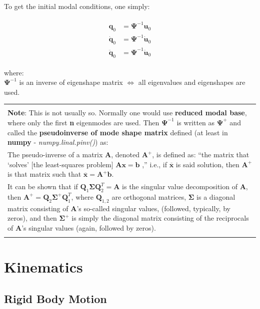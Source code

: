 \documentclass[10pt,b5paper,titlepage]{book}
\newcommand{\m}{\mathbf}
\newcommand{\M}{\pmb}
\newenvironment{bbox}[1][0.96]
{
    \begin{center}
        \begin{tabular}{|p{#1\textwidth}|}
            \hline\\
}
{
            \\\\\hline
        \end{tabular}
    \end{center}
}
\newenvironment{eqarray}
{
    \begin{eqnarray}
        \begin{aligned}
}
{
        \end{aligned}
    \end{eqnarray}
}
\begin{document}
To get the initial modal conditions, one simply:

\begin{eqarray}
    \m{q}_0 &= \M{\Psi}^{-1} \m{u}_0 \\
    \m{\dot{q}}_0 &= \M{\Psi}^{-1} \m{\dot{u}}_0 \\
    \m{\ddot{q}}_0 &= \M{\Psi}^{-1} \m{\ddot{u}}_0
\end{eqarray}

where:\\
$ \M{\Psi}^{-1} $ is an inverse of eigenshape matrix $ \Leftrightarrow $ all eigenvalues
and eigenshapes are used.

\begin{bbox}[0.96]
    \textbf{Note}: This is not usually so. Normally one would use
    \textbf{reduced modal base}, where only the first \textbf{n} eigenmodes are used. Then
    $ \M{\Psi}^{-1} $ is written as $ \M{\Psi}^{+} $ and called the
    \textbf{pseudoinverse of mode shape matrix} defined (at least in \textbf{numpy}
    - \textit{numpy.linal.pinv()}) as:\\

    \smallskip
    The pseudo-inverse of a matrix $ \m{A} $, denoted $ \m{A}^{+} $,
    is defined as: “the matrix that ‘solves’ [the least-squares problem]
    $ \m{A} \m{x} = \m{b} $ ,” i.e., if $ \overline{\m{x}} $
    is said solution, then $ \m{A}^{+} $ is that matrix such that
    $ \overline{\m{x}} = \m{A}^{+} \m{b} $.\\

    \smallskip
    It can be shown that if $ \m{Q}_1 \M{\Sigma} \m{Q}_2^T = \m{A} $
    is the singular value decomposition of $ \m{A} $, then
    $ \m{A}^{+} = \m{Q}_2 \M{\Sigma}^{+} \m{Q}_1^T $, where $ \m{Q}_{1,2} $
    are orthogonal matrices, $ \M{\Sigma} $  is a diagonal matrix consisting of
    $ \m{A} $’s so-called singular values, (followed, typically, by zeros),
    and then $ \M{\Sigma}^{+} $ is simply the diagonal matrix consisting
    of the reciprocals of $ \m{A} $’s singular values (again, followed
    by zeros).
\end{bbox}



\chapter{Kinematics}
\section{Rigid Body Motion}
\end{document}
